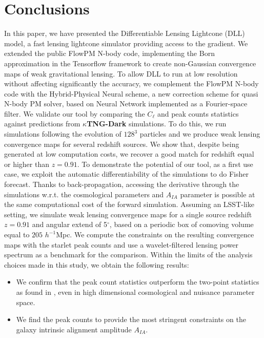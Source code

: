 \documentclass{aa}
\begin{document}
\section{Conclusions}\label{Conclusions}
In this paper, we have presented the Differentiable Lensing Lightcone (DLL) model, a fast lensing lightcone simulator providing access to the gradient. 
We extended the public FlowPM N-body code, implementing the Born approximation in the Tensorflow framework to create non-Gaussian convergence maps of weak gravitational lensing. To allow DLL to run at low resolution without affecting significantly the accuracy, we complement the FlowPM N-body code with the Hybrid-Physical Neural scheme, a new correction scheme for quasi N-body PM solver, based on Neural Network implemented as a Fourier-space filter. 
We validate our tool by comparing the $C_{\ell}$ and peak counts statistics against predictions from \textbf{$\kappa$TNG-Dark} simulations. 
To do this, we run simulations following the evolution of $128^3$ particles and we produce weak lensing convergence maps for several redshift sources. 
We show that, despite being generated at low computation costs, we recover a good match for redshift equal or higher than $z=0.91$. 
To demonstrate the potential of our tool, as a first use case, we exploit the automatic differentiability of the simulations to do Fisher forecast. 
Thanks to back-propagation, accessing the derivative through the simulations w.r.t. the cosmological parameters and $A_{IA}$ parameter is possible at the same computational cost of the forward simulation.
Assuming an LSST-like setting, we simulate weak lensing convergence maps for a single source redshift $z=0.91$ and angular extend of 5$^\circ$, based on a periodic box of
comoving volume equal to  $205$ $h^{-1}$Mpc.
We compute the constraints on the resulting convergence maps
with the starlet peak counts and use a wavelet-filtered lensing power spectrum as a benchmark for the comparison.
 Within the limits of the analysis choices made in this study, we obtain the following results:
\begin{itemize}
    \item  We confirm that the peak count statistics outperform the two-point statistics as found in \cite{ajani2020constraining},
 even in high dimensional cosmological and nuisance parameter space.
    \item We find the peak counts to provide the most stringent constraints on the galaxy intrinsic alignment amplitude $A_{IA}$. 
\end{itemize}
\end{document}
